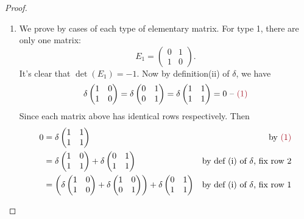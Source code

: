 \begin{proof} \ 

\begin{enumerate}
\item
We prove by cases of each type of elementary matrix.
For type 1, there are only one matrix:
\[
    E_1 = \begin{pmatrix}
        0 & 1 \\
        1 & 0
    \end{pmatrix}.
\]
It's clear that \(\det(E_1) = -1\).
Now by definition(ii) of \(\delta\), we have
\[
    \delta \begin{pmatrix} 1 & 0 \\ 1 & 0 \end{pmatrix}
    = \delta \begin{pmatrix} 0 & 1 \\ 0 & 1 \end{pmatrix}
    = \delta \begin{pmatrix} 1 & 1 \\ 1 & 1 \end{pmatrix}
    = 0 \text{ -- \MAROON{(1)}}
\]
Since each matrix above has identical rows respectively.
Then
\begin{align*}
    0 & = \delta \begin{pmatrix} 1 & 1 \\ 1 & 1 \end{pmatrix} & \text{by \MAROON{(1)}} \\
      & = \delta \begin{pmatrix} 1 & 0 \\ 1 & 1 \end{pmatrix}
          + \delta \begin{pmatrix} 0 & 1 \\ 1 & 1 \end{pmatrix} & \text{by def (i) of \(\delta\), fix row \(2\)} \\
      & = \left( \delta \begin{pmatrix} 1 & 0 \\ 1 & 0 \end{pmatrix} + \delta \begin{pmatrix} 1 & 0 \\ 0 & 1 \end{pmatrix} \right)
          + \delta \begin{pmatrix} 0 & 1 \\ 1 & 1 \end{pmatrix} & \text{by def (i) of \(\delta\), fix row \(1\)} \\

\end{align*}
\end{enumerate}
\end{proof}
